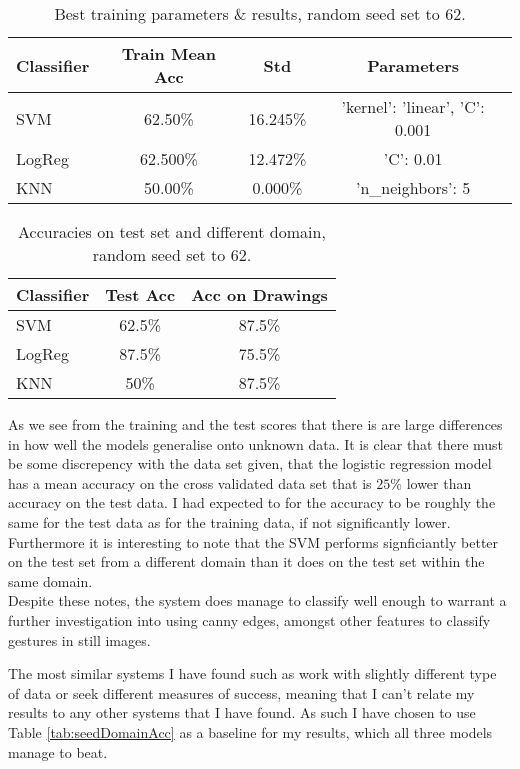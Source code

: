\documentclass[11pt, a4paper]{article}
\begin{document}
\begin{table}[h]
  \centering
  \tiny
  \setlength\tabcolsep{2pt}
    \begin{tabular}{l|ccc}
    Classifier & Train Mean Acc & Std      & Parameters                     \\\hline
    SVM        & 62.50\%        & 16.245\% & 'kernel': 'linear', 'C': 0.001 \\
    LogReg     & 62.500\%       & 12.472\% & 'C': 0.01                      \\
    KNN        & 50.00\%        & 0.000\%  & 'n\_neighbors': 5
    \end{tabular}
  \caption{Best training parameters \& results, random seed set to 62.}
  \label{tab:TrainAcc}
\end{table}
\begin{table}[h]
  \centering
  \small
    \begin{tabular}{l|cc}
    Classifier & Test Acc & Acc on Drawings \\\hline
    SVM        & 62.5\%   & 87.5\%          \\
    LogReg     & 87.5\%   & 75.5\%          \\
    KNN        & 50\%     & 87.5\%
    \end{tabular}
  \caption{Accuracies on test set and different domain, random seed set to 62.}
  \label{tab:testDomainAcc}
\end{table}

As we see from the training and the test scores that there is are large differences in how well the models generalise onto unknown data. It is clear that there must be some discrepency with the data set given, that the logistic regression model has a mean accuracy on the cross validated data set that is \(25\%\) lower than accuracy on the test data. I had expected to for the accuracy to be roughly the same for the test data as for the training data, if not significantly lower. Furthermore it is interesting to note that the SVM performs signficiantly better on the test set from a different domain than it does on the test set within the same domain.\\
Despite these notes, the system does manage to classify well enough to warrant a further investigation into using canny edges, amongst other features to classify gestures in still images.

The most similar systems I have found such as  work with slightly different type of data or seek different measures of success, meaning that I can't relate my results to any other systems that I have found. As such I have chosen to use Table \ref{tab:seedDomainAcc} as a baseline for my results, which all three models manage to beat.\\
\end{document}

